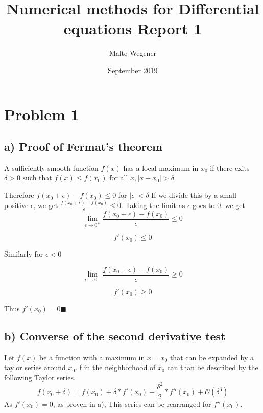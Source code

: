 \documentclass{article}
\title{Numerical methods for Differential equations Report 1}
\author{Malte Wegener}
\date{September 2019}
\begin{document}
\maketitle
    
\section{Problem 1}
\subsection{a) Proof of Fermat's theorem}

A sufficiently smooth function $f(x)$ has a local maximum in $x_{0}$ if there exits $\delta > 0$ such that $f(x) \leq f(x_{0})$ for all $x, \mid x - x_{0} \mid > \delta$ \par
Therefore $f(x_{0}+\epsilon)-f(x_{0}) \leq 0$ for $\mid \epsilon \mid < \delta$
If we divide this by a small positive $\epsilon$, we get $\frac{f(x_{0}+\epsilon)-f(x_{0})}{\epsilon}\leq 0$.
Taking the limit as $\epsilon$ goes to 0, we get
\begin{equation*}
   \lim_{\epsilon\to 0^{+}} \frac{f(x_{0}+\epsilon)-f(x_{0})}{\epsilon}\leq 0
\end{equation*}

\begin{equation*}
   f'(x_{0})\leq 0
\end{equation*}

Similarly for $\epsilon < 0$

\begin{equation*}
   \lim_{\epsilon\to 0^{-}} \frac{f(x_{0}+\epsilon)-f(x_{0})}{\epsilon}\geq 0
  \end{equation*}
   
\begin{equation*}
   f'(x_{0})\geq 0
\end{equation*}

Thus $f'(x_{0}) = 0 \blacksquare$

\subsection{b) Converse of the second derivative test}
Let $f(x)$ be a function with a maximum in $x=x_{0}$ that can be expanded by a taylor series around $x_{0}$. f in the neighborhood of $x_{0}$ can than be described by the following Taylor series.
\begin{equation*}
    f(x_{0}+\delta) = f(x_{0})+\delta*f'(x_{0})+\frac{\delta^2}{2}*f''(x_{0}) + \mathcal{O}(\delta^3)
\end{equation*}
As $f'(x_{0}) = 0$, as proven in a), This series can be rearranged for $f''(x_{0})$.
\end{document}
